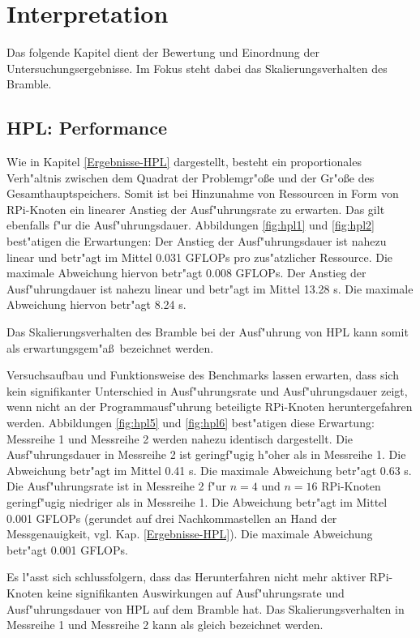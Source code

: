 \chapter{Interpretation}\label{Kap4}

Das folgende Kapitel dient der Bewertung und Einordnung der Untersuchungsergebnisse. Im Fokus steht dabei das Skalierungsverhalten des Bramble.    

\section{HPL: Performance}\label{Interpretation-Linpack}
Wie in Kapitel \ref{Ergebnisse-HPL} dargestellt, besteht ein proportionales Verh"altnis zwischen dem Quadrat der Problemgr"o\ss e und der Gr"o\ss e des Gesamthauptspeichers. Somit ist bei Hinzunahme von Ressourcen in Form von RPi-Knoten ein linearer Anstieg der Ausf"uhrungsrate zu erwarten. Das gilt ebenfalls f"ur die Ausf"uhrungsdauer. Abbildungen \ref{fig:hpl1} und \ref{fig:hpl2} best"atigen die Erwartungen: Der Anstieg der Ausf"uhrungsdauer ist nahezu linear und betr"agt im Mittel 0.031 GFLOPs pro zus"atzlicher Ressource. Die maximale Abweichung hiervon betr"agt 0.008 GFLOPs. Der Anstieg der Ausf"uhrungdauer ist nahezu linear und betr"agt im Mittel 13.28 s. Die maximale Abweichung hiervon betr"agt 8.24 s.

Das Skalierungsverhalten des Bramble bei der Ausf"uhrung von HPL kann somit als erwartungsgem"a\ss\ bezeichnet werden.

Versuchsaufbau und Funktionsweise des Benchmarks lassen erwarten, dass sich kein signifikanter Unterschied in Ausf"uhrungsrate und Ausf"uhrungsdauer zeigt, wenn nicht an der Programmausf"uhrung beteiligte RPi-Knoten heruntergefahren werden. Abbildungen \ref{fig:hpl5} und \ref{fig:hpl6} best"atigen diese Erwartung: Messreihe 1 und Messreihe 2 werden nahezu identisch dargestellt. Die Ausf"uhrungsdauer in Messreihe 2 ist geringf"ugig h"oher als in Messreihe 1. Die Abweichung betr"agt im Mittel 0.41 s. Die maximale Abweichung betr"agt 0.63 s. Die Ausf"uhrungsrate ist in Messreihe 2 f"ur $n=4$ und $n=16$ RPi-Knoten geringf"ugig niedriger als in Messreihe 1. Die Abweichung betr"agt im Mittel 0.001 GFLOPs (gerundet auf drei Nachkommastellen an Hand der Messgenauigkeit, vgl. Kap. \ref{Ergebnisse-HPL}). Die maximale Abweichung betr"agt 0.001 GFLOPs. 

Es l"asst sich schlussfolgern, dass das Herunterfahren nicht mehr aktiver RPi-Knoten keine signifikanten Auswirkungen auf Ausf"uhrungsrate und Ausf"uhrungsdauer von HPL auf dem Bramble hat. Das Skalierungsverhalten in Messreihe 1 und Messreihe 2 kann als gleich bezeichnet werden. 
